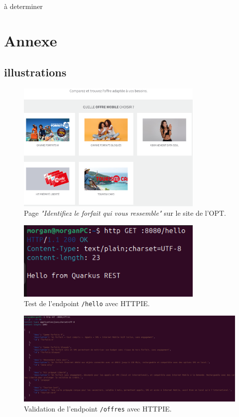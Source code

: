 \documentclass{article}
\begin{document}
	à determiner
	
	\newpage
	\section{Annexe}
	\subsection{illustrations}
		\begin{figure}[H]
		\centering
		\includegraphics[width=0.8\textwidth]{asset/page_forfait.png}
		\caption{Page \textit{"Identifiez le forfait qui vous ressemble"} sur le site de l’OPT.}
		\label{fig:page_forfait}
	\end{figure}
	\begin{figure}[H]
		\centering
		\includegraphics[width=0.8\textwidth]{asset/hello.png}
		\caption{Test de l'endpoint \texttt{/hello} avec HTTPIE.}
		\label{fig:hello_endpoint}
	\end{figure}
	\begin{figure}[H]
		\centering
		\includegraphics[width=1\textwidth]{asset/endpoint offres.png}
		\caption{Validation de l'endpoint \texttt{/offres} avec HTTPIE.}
		\label{fig:offres_endpoint}
	\end{figure}
\end{document}
